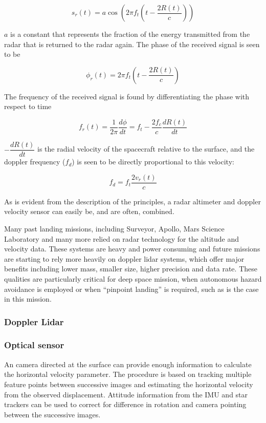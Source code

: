 \begin{equation}
s_r(t)=a \cos(2 \pi f_t(t-\dfrac{2R(t)}{c}))
\end{equation}

$a$ is a constant that represents the fraction of the energy transmitted from the radar
that is returned to the radar again. The phase of the received signal is seen to be 

\begin{equation}
\phi_r(t)=2 \pi f_t(t-\dfrac{2R(t)}{c})
\end{equation}


The frequency of the received signal is found by differentiating the phase with respect
to time

\begin{equation}
f_r(t)=\dfrac{1}{2 \pi}\dfrac{d\phi}{dt} = f_t - \dfrac{2 f_c}{c}\dfrac{dR(t)}{dt}
\end{equation}

$-\dfrac{dR(t)}{dt}$ is the radial velocity of the spacecraft relative to the surface, and the doppler frequency ($f_d$) is seen to be directly proportional to this velocity:

\begin{equation}
f_d= f_t\dfrac{2 v_r(t)}{c}
\end{equation}

As is evident from the description of the principles, a radar altimeter and doppler velocity sensor can easily be, and are often, combined. 

Many past landing missions, including Surveyor, Apollo, Mars Science Laboratory and many more relied on radar
technology for the altitude and velocity data. These systems are heavy and power consuming and future missions are starting to rely more heavily on doppler lidar systems, which offer major benefits including lower mass, smaller
size, higher precision and data rate. These qualities are particularly critical for deep space mission, when autonomous hazard avoidance is employed or when “pinpoint landing” is required, such as is the case in this mission. \cite{http://ntrs.nasa.gov/archive/nasa/casi.ntrs.nasa.gov/20140002742.pdf}


\subsubsection{Doppler Lidar}
 

  
\subsubsection{Optical sensor}
An camera directed at the surface can provide enough information to calculate the horizontal velocity parameter. The procedure is based on tracking multiple feature points between successive images and estimating the horizontal velocity from the observed displacement. Attitude information from the IMU and star trackers can be used to correct for difference in rotation and camera pointing between the successive images.   \cite{Allessandro}

